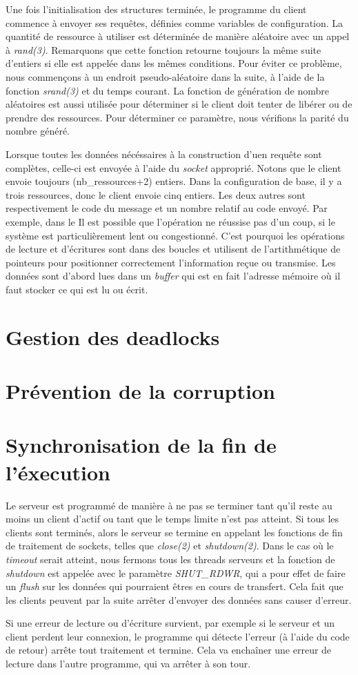 \documentclass[letterpaper,12pt]{scrartcl}
\begin{document}
Une fois l'initialisation des structures terminée, le programme du client commence à envoyer ses requêtes, définies comme variables de configuration. La quantité de ressource à utiliser est déterminée de manière aléatoire avec un appel à \textit{rand(3)}. Remarquons que cette fonction retourne toujours la même suite d'entiers si elle est appelée dans les mêmes conditions. Pour éviter ce problème, nous commençons à un endroit pseudo-aléatoire dans la suite, à l'aide de la fonction \textit{srand(3)} et du temps courant. La fonction de génération de nombre aléatoires est aussi utilisée pour déterminer si le client doit tenter de libérer ou de prendre des ressources. Pour déterminer ce paramètre, nous vérifions la parité du nombre généré. 

Lorsque toutes les données nécéssaires à la construction d'uen requête sont complètes, celle-ci est envoyée à l'aide du \textit{socket} approprié. Notons que le client envoie toujours (nb_ressources+2) entiers. Dans la configuration de base, il y a trois ressources, donc le client envoie cinq entiers. Les deux autres sont respectivement le code du message et un nombre relatif au code envoyé. Par exemple, dans le  Il est possible que l'opération ne réussise pas d'un coup, si le système est particulièrement lent ou congestionné. C'est pourquoi les opérations de lecture et d'écritures sont dans des boucles et utilisent de l'artithmétique de pointeurs pour positionner correctement l'information reçue ou transmise. Les données sont d'abord lues dans un \textit{buffer} qui est en fait l'adresse mémoire où il faut stocker ce qui est lu ou écrit.
\section{Gestion des deadlocks}
\section{Prévention de la corruption}
\section{Synchronisation de la fin de l'éxecution}
Le serveur est programmé de manière à ne pas se terminer tant qu'il reste au moins un client d'actif ou tant que le temps limite n'est pas atteint. Si tous les clients sont terminés, alors le serveur se termine en appelant les fonctions de fin de traitement de sockets, telles que \textit{close(2)} et \textit{shutdown(2)}. Dans le cas où le \textit{timeout} serait atteint, nous fermons tous les threads serveurs et la fonction de \textit{shutdown} est appelée avec le paramètre \textit{SHUT\_RDWR}, qui a pour effet de faire un \textit{flush} sur les données qui pourraient êtres en cours de transfert. Cela fait que les clients peuvent par la suite arrêter d'envoyer des données sans causer d'erreur.

Si une erreur de lecture ou d'écriture survient, par exemple si le serveur et un client perdent leur connexion, le programme qui détecte l'erreur (à l'aide du code de retour) arrête tout traitement et termine. Cela va enchaîner une erreur de lecture dans l'autre programme, qui va arrêter à son tour.
\end{document}
